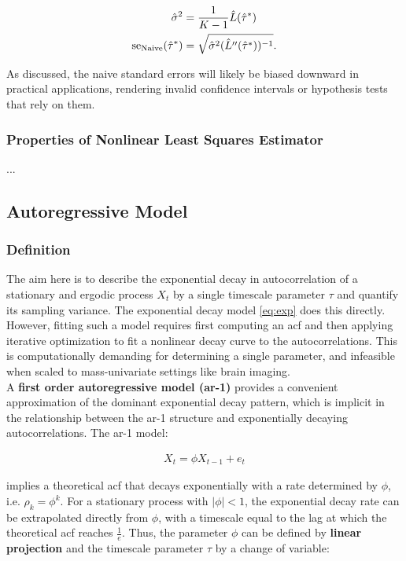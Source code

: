 \documentclass[main.tex]{subfiles}
\begin{document}
\begin{align}
    \hat\sigma^2 &= \frac{1}{K-1} \hat L(\hat\tau^*) \notag\\
    \text{se}_\text{Naive}(\hat\tau^*) &= \sqrt{\hat\sigma^2 (\hat L''(\hat\tau^*))^{-1}}.
\end{align}

As discussed, the naive standard errors will likely be biased downward in practical applications, rendering invalid confidence intervals or hypothesis tests that rely on them.

\subsubsection{Properties of Nonlinear Least Squares Estimator}
...


\subsection{Autoregressive Model}
\subsubsection{Definition}
The aim here is to describe the exponential decay in autocorrelation of a stationary and ergodic process $X_t$ by a single timescale parameter $\tau$ and quantify its sampling variance. The exponential decay model \eqref{eq:exp} does this directly. However, fitting such a model requires first computing an acf and then applying iterative optimization to fit a nonlinear decay curve to the autocorrelations. This is computationally demanding for determining a single parameter, and infeasible when scaled to mass-univariate settings like brain imaging.\\

A \textbf{first order autoregressive model (ar-1)} provides a convenient approximation of the dominant exponential decay pattern, which is implicit in the relationship between the ar-1 structure and exponentially decaying autocorrelations. The ar-1 model:

\begin{align}\label{eq:ar1}
    X_t = \phi X_{t-1} + e_t
\end{align}

implies a theoretical acf that decays exponentially with a rate determined by $\phi$, i.e. $\rho_k = \phi^k$. For a stationary process with $|\phi|<1$, the exponential decay rate can be extrapolated directly from $\phi$, with a timescale equal to the lag at which the theoretical acf reaches $\frac{1}{e}$. Thus, the parameter $\phi$ can be defined by \textbf{linear projection} and the timescale parameter $\tau$ by a change of variable:
\end{document}
